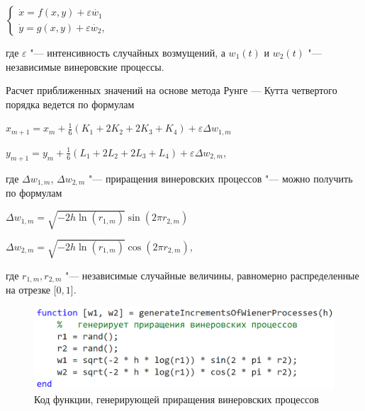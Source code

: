 \documentclass[a4paper, 14pt]{article}
\begin{document}
		\begin{center}
			\begin{math}
				\begin{cases}
					\dot x = f(x, y) + \varepsilon\dot{w_1} \\
					\dot y = g(x, y) + \varepsilon\dot{w_2},
				\end{cases}
			\end{math}
		\end{center}
		
		где $\varepsilon$ "--- интенсивность случайных возмущений, а $w_1(t)$ и $w_2(t)$ "--- независимые винеровские процессы.
		
		Расчет приближенных значений на основе метода Рунге — Кутта четвертого порядка ведется по формулам
		
		\begin{center}
			$x_{m+1} = x_m + \frac16 \left(K_1 + 2K_2 + 2K_3 + K_4\right) + \varepsilon\Delta{w_{1, m}}$
			
			$y_{m+1} = y_m + \frac16 \left(L_1 + 2L_2 + 2L_3 + L_4\right) + \varepsilon\Delta{w_{2, m}}$,
		\end{center}
		
		где $\Delta{w_{1, m}}$, $\Delta{w_{2, m}}$ "--- приращения винеровских процессов "--- можно	получить по формулам
		
		\begin{center}
			$\Delta{w_{1, m}} = \sqrt{-2h\ln (r_{1, m})} \sin (2\pi r_{2, m})$
			
			$\Delta{w_{2, m}} = \sqrt{-2h\ln (r_{1, m})} \cos (2\pi r_{2, m})$,
		\end{center}
		
		где $r_{1, m}, r_{2, m}$ "--- независимые случайные величины, равномерно распределенные на отрезке [$0, 1$].
		
		\begin{figure}[!ht]
			\begin{center}
				\includegraphics[scale=0.35]{img/code_wiener.png}\caption{Код функции, генерирующей приращения винеровских процессов}
			\end{center}
		\end{figure}
		
\end{document}
